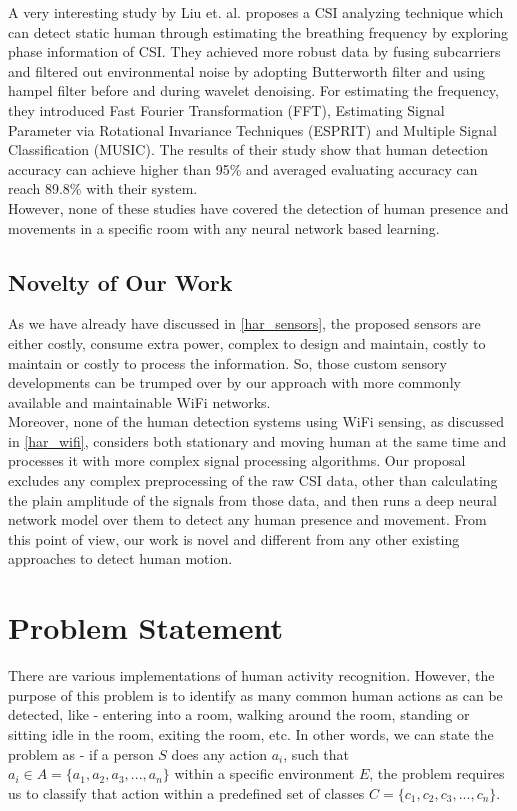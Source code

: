 \documentclass[conference]{IEEEtran}
\begin{document}
A very interesting study by Liu et. al. \cite{liu_breathing} proposes a CSI analyzing technique which can detect static human through estimating the breathing frequency by exploring phase information of CSI. They achieved more robust data by fusing subcarriers and filtered out environmental noise by adopting Butterworth filter and using hampel filter before and during wavelet denoising. For estimating the frequency, they introduced Fast Fourier Transformation (FFT), Estimating Signal Parameter via Rotational Invariance Techniques (ESPRIT) and Multiple Signal Classification (MUSIC). The results of their study show that human detection accuracy can achieve higher than 95\% and averaged evaluating accuracy can reach 89.8\% with their system.\\
However, none of these studies have covered the detection of human presence and movements in a specific room with any neural network based learning.

\subsection{Novelty of Our Work}
As we have already have discussed in \ref{har_sensors}, the proposed sensors are either costly, consume extra power, complex to design and maintain, costly to maintain or costly to process the information. So, those custom sensory developments can be trumped over by our approach with more commonly available and maintainable WiFi networks.\\
Moreover, none of the human detection systems using WiFi sensing, as discussed in \ref{har_wifi}, considers both stationary and moving human at the same time and processes it with more complex signal processing algorithms. Our proposal excludes any complex preprocessing of the raw CSI data, other than calculating the plain amplitude of the signals from those data, and then runs a deep neural network model over them to detect any human presence and movement. From this point of view, our work is novel and different from any other existing approaches to detect human motion.




\section{Problem Statement}
\label{section_problem_statement}
There are various implementations of human activity recognition. However, the purpose of this problem is to identify as many common human actions as can be detected, like - entering into a room, walking around the room, standing or sitting idle in the room, exiting the room, etc.
In other words, we can state the problem as - if a person $S$ does any action $a_i$, such that $a_i \in A=\{a_1, a_2, a_3, ..., a_n\}$ within a specific environment ${E}$, the problem requires us to classify that action within a predefined set of classes $C=\{c_1, c_2, c_3, ..., c_n\}$.
\end{document}
